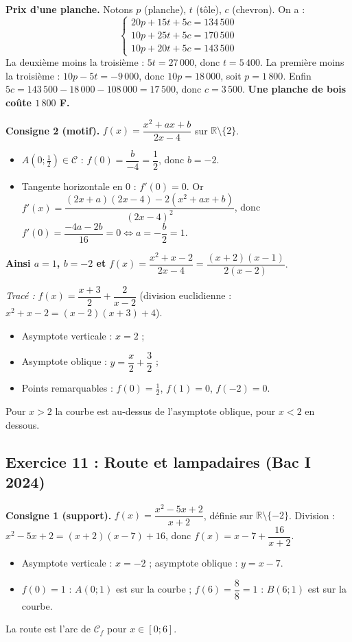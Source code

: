 \documentclass[11pt,a4paper]{article}
\newcommand{\R}{\mathbb{R}}
\begin{document}
\medskip\noindent\textbf{Prix d'une planche.} Notons $p$ (planche), $t$ (t\^ole), $c$ (chevron). On a :
\[
\begin{cases}
20p+15t+5c=134\,500\\
10p+25t+5c=170\,500\\
10p+20t+5c=143\,500
\end{cases}
\]
La deuxi\`eme moins la troisi\`eme : $5t=27\,000$, donc $t=5\,400$.
La premi\`ere moins la troisi\`eme : $10p-5t=-9\,000$, donc $10p=18\,000$, soit $p=1\,800$.
Enfin $5c=143\,500-18\,000-108\,000=17\,500$, donc $c=3\,500$.
\textbf{Une planche de bois co\^ute $1\,800$ F.}

\medskip\noindent\textbf{Consigne 2 (motif).} $f(x)=\dfrac{x^2+ax+b}{2x-4}$ sur $\R\setminus\{2\}$.
\begin{itemize}
  \item $A(0;\frac12)\in\mathcal C$ : $f(0)=\dfrac{b}{-4}=\dfrac12$, donc $b=-2$.
  \item Tangente horizontale en $0$ : $f'(0)=0$. Or $f'(x)=\dfrac{(2x+a)(2x-4)-2(x^2+ax+b)}{(2x-4)^2}$,
  donc $f'(0)=\dfrac{-4a-2b}{16}=0\iff a=-\dfrac{b}{2}=1$.
\end{itemize}
\textbf{Ainsi $a=1$, $b=-2$ et} $f(x)=\dfrac{x^2+x-2}{2x-4}=\dfrac{(x+2)(x-1)}{2(x-2)}$.

\emph{Trac\'e :} $f(x)=\dfrac{x+3}{2}+\dfrac{2}{x-2}$ (division euclidienne : $x^2+x-2=(x-2)(x+3)+4$).
\begin{itemize}
  \item Asymptote verticale : $x=2$ ;
  \item Asymptote oblique : $y=\dfrac{x}{2}+\dfrac32$ ;
  \item Points remarquables : $f(0)=\frac12$, $f(1)=0$, $f(-2)=0$.
\end{itemize}
Pour $x>2$ la courbe est au-dessus de l'asymptote oblique, pour $x<2$ en dessous.

\subsection{Exercice 11 : Route et lampadaires (Bac I 2024)}

\textbf{Consigne 1 (support).} $f(x)=\dfrac{x^2-5x+2}{x+2}$, d\'efinie sur $\R\setminus\{-2\}$.
Division : $x^2-5x+2=(x+2)(x-7)+16$, donc $f(x)=x-7+\dfrac{16}{x+2}$.
\begin{itemize}
  \item Asymptote verticale : $x=-2$ ; asymptote oblique : $y=x-7$.
  \item $f(0)=1$ : $A(0;1)$ est sur la courbe ; $f(6)=\dfrac{8}{8}=1$ : $B(6;1)$ est sur la courbe.
\end{itemize}
La route est l'arc de $\mathcal C_f$ pour $x\in[0;6]$.
\end{document}
